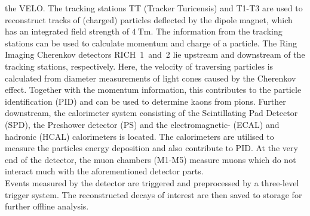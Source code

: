 the VELO. 
The tracking stations TT (Tracker Turicensis) and T1-T3 are used to reconstruct tracks of (charged) particles deflected by the dipole magnet, 
which has an integrated field strength of $\qty{4}{\tesla\metre}$. The information from the tracking stations can be used to calculate momentum and charge of a particle.
The Ring Imaging Cherenkov detectors RICH~1~and~2 lie upstream and downstream of the tracking stations, respectively. 
Here, the velocity of traversing particles is calculated from diameter measurements of light cones caused by the Cherenkov effect. 
Together with the momentum information, this contributes to the particle identification (PID) and can be used to determine kaons from pions. 
Further downstream, the calorimeter system consisting of the Scintillating Pad Detector (SPD), the Preshower detector (PS) and the electromagnetic- (ECAL) and 
hadronic (HCAL) calorimeters is located. The calorimeters are utilised to measure the particles energy deposition and also contribute to PID.
At the very end of the detector, the muon chambers (M1-M5) measure muons which do not interact much with the aforementioned detector parts. \\
Events measured by the detector are triggered and preprocessed by a three-level trigger system. The reconstructed decays of interest are then saved to storage for further offline 
analysis. 

